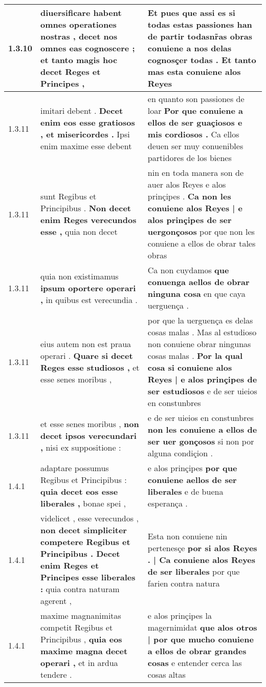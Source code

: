 \begin{tabular}{|p{1cm}|p{6.5cm}|p{6.5cm}|}
1.3.10 & diuersificare habent omnes operationes nostras , \textbf{ decet nos omnes eas cognoscere ; } et tanto magis hoc decet Reges et Principes , & Et pues que assi es si todas estas passiones han de partir \textbf{ todasnr̃as obras conuiene a nos delas cognosçer todas . } Et tanto mas esta conuiene alos Reyes \\\hline
1.3.11 & imitari debent . \textbf{ Decet enim eos esse gratiosos , et misericordes . } Ipsi enim maxime esse debent & en quanto son passiones de loar \textbf{ Por que conuiene a ellos de ser guaçiosos e mis cordiosos . } Ca ellos deuen ser muy conuenibles partidores de los bienes \\\hline
1.3.11 & sunt Regibus et Principibus . \textbf{ Non decet enim Reges verecundos esse , } quia non decet & nin en toda manera son de auer alos Reyes e alos prinçipes . \textbf{ Ca non les conuiene alos Reyes | e alos prinçipes de ser uergonçosos } por que non les conuiene a ellos de obrar tales obras \\\hline
1.3.11 & quia non existimamus \textbf{ ipsum oportere operari , } in quibus est verecundia . & Ca non cuydamos \textbf{ que conuenga aellos de obrar ninguna cosa } en que caya uerguença . \\\hline
1.3.11 & eius autem non est praua operari . \textbf{ Quare si decet Reges esse studiosos , } et esse senes moribus , & por que la uerguença es delas cosas malas . Mas al estudioso non conuiene obrar ningunas cosas malas . \textbf{ Por la qual cosa si conuiene alos Reyes | e alos prinçipes de ser estudiosos } e de ser uieios en constunbres \\\hline
1.3.11 & et esse senes moribus , \textbf{ non decet ipsos verecundari , } nisi ex suppositione : & e de ser uieios en constunbres \textbf{ non les conuiene a ellos de ser uer gonçosos } si non por alguna condiçion . \\\hline
1.4.1 & adaptare possumus Regibus et Principibus : \textbf{ quia decet eos esse liberales , } bonae spei , & e alos prinçipes \textbf{ por que conuiene aellos de ser liberales } e de buena esperança . \\\hline
1.4.1 & videlicet , esse verecundos , \textbf{ non decet simpliciter competere Regibus et Principibus . Decet enim Reges et Principes esse liberales : } quia contra naturam agerent , & Esta non conuiene nin pertenesçe \textbf{ por si alos Reyes . | Ca conuiene alos Reyes de ser liberales } por que farien contra natura \\\hline
1.4.1 & maxime magnanimitas competit Regibus et Principibus , \textbf{ quia eos maxime magna decet operari , } et in ardua tendere . & e alos prinçipes la magernimidat \textbf{ que alos otros | por que mucho conuiene a ellos de obrar grandes cosas } e entender cerca las cosas altas \\\hline

\end{tabular}
